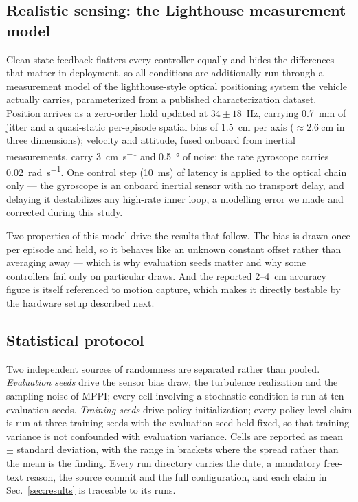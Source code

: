 \subsection{Realistic sensing: the Lighthouse measurement model}
\label{sec:method:sensor}

Clean state feedback flatters every controller equally and hides the differences that
matter in deployment, so all conditions are additionally run through a measurement model
of the lighthouse-style optical positioning system the vehicle actually carries,
parameterized from a published characterization
dataset\cite{taffanel2021lighthouse}. Position arrives as a zero-order hold updated at
$34\pm18$~\si{\hertz}, carrying \SI{0.7}{\milli\meter} of jitter and a quasi-static
per-episode spatial bias of \SI{1.5}{\centi\meter} per axis
($\approx\SI{2.6}{\centi\meter}$ in three dimensions); velocity and attitude, fused
onboard from inertial measurements, carry \SI{3}{\centi\meter\per\second} and
\SI{0.5}{\degree} of noise; the rate gyroscope carries
\SI{0.02}{\radian\per\second}. One control step (\SI{10}{\milli\second}) of latency is
applied to the optical chain only --- the gyroscope is an onboard inertial sensor with
no transport delay, and delaying it destabilizes any high-rate inner loop, a modelling
error we made and corrected during this study.

Two properties of this model drive the results that follow. The bias is drawn once per
episode and held, so it behaves like an unknown constant offset rather than averaging
away --- which is why evaluation seeds matter and why some controllers fail only on
particular draws. And the reported \SI{2}{}--\SI{4}{\centi\meter} accuracy figure is
itself referenced to motion capture, which makes it directly testable by the hardware
setup described next.



\subsection{Statistical protocol}
\label{sec:method:stats}

Two independent sources of randomness are separated rather than pooled. \emph{Evaluation
seeds} drive the sensor bias draw, the turbulence realization and the sampling noise of
MPPI; every cell involving a stochastic condition is run at ten evaluation seeds.
\emph{Training seeds} drive policy initialization; every policy-level claim is run at
three training seeds with the evaluation seed held fixed, so that training variance is
not confounded with evaluation variance. Cells are reported as mean $\pm$ standard
deviation, with the range in brackets where the spread rather than the mean is the
finding. Every run directory carries the date, a mandatory free-text reason, the source
commit and the full configuration, and each claim in Sec.~\ref{sec:results} is traceable
to its runs.
